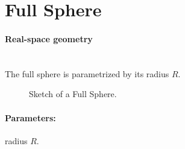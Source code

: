 
\newpage
\section{Full Sphere} 

\paragraph{Real-space geometry}\mbox{}\\
The full sphere is parametrized by its radius $R$. 

\begin{figure}[ht]
\hfill
{}
\hfill
{}
\hfill
\caption{Sketch of a Full Sphere.}
\label{fig:fullsphere}
\end{figure}

\FloatBarrier

\paragraph{Parameters:} radius $R$.


